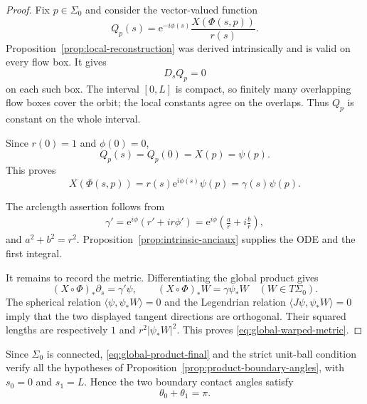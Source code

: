 \documentclass[11pt,a4paper]{article}
\numberwithin{equation}{section}
\newcommand{\ee}{\mathrm e}
\begin{document}
\begin{proof}
Fix $p\in\Sigma_0$ and consider the vector-valued function
$$
        Q_p(s)=\ee^{-i\phi(s)}\frac{X(\Phi(s,p))}{r(s)}.
$$
Proposition~\ref{prop:local-reconstruction} was derived intrinsically and is
valid on every flow box.  It gives $$D_sQ_p=0$$ on each such box.  The interval
$[0,L]$ is compact, so finitely many overlapping flow boxes cover the orbit;
the local constants agree on the overlaps.  Thus $Q_p$ is constant on the
whole interval.  

Since $r(0)=1$ and $\phi(0)=0$,
$$
        Q_p(s)=Q_p(0)=X(p)=\psi(p).
$$
This proves
$$
        X(\Phi(s,p))=r(s)\ee^{i\phi(s)}\psi(p)=\gamma(s)\psi(p).
$$

The arclength assertion follows from
$$
\begin{aligned}
        \gamma'
        =\ee^{i\phi}(r'+ir\phi')
 =\ee^{i\phi}\left(\frac ar+i\frac br\right),
\end{aligned}
$$
and $a^2+b^2=r^2$.  Proposition~\ref{prop:intrinsic-anciaux} supplies the ODE
and the first integral.

It remains to record the metric.  Differentiating the global product gives
$$
        (X\circ\Phi)_*\partial_s=\gamma'\psi,
        \qquad
        (X\circ\Phi)_*W=\gamma\psi_*W
        \quad(W\in T\Sigma_0).
$$
The spherical relation $\langle\psi,\psi_*W\rangle=0$ and the Legendrian
relation $\langle J\psi,\psi_*W\rangle=0$ imply that the two displayed tangent
directions are orthogonal.  Their squared lengths are respectively $1$ and
$r^2|\psi_*W|^2$.  This proves \eqref{eq:global-warped-metric}.
\end{proof}


Since $\Sigma_0$ is connected, \eqref{eq:global-product-final} and the strict
unit-ball condition verify all the hypotheses of
Proposition~\ref{prop:product-boundary-angles}, with $s_0=0$ and $s_1=L$.
Hence the two boundary contact angles satisfy
$$
        \theta_0+\theta_1=\pi.
$$
\end{document}
